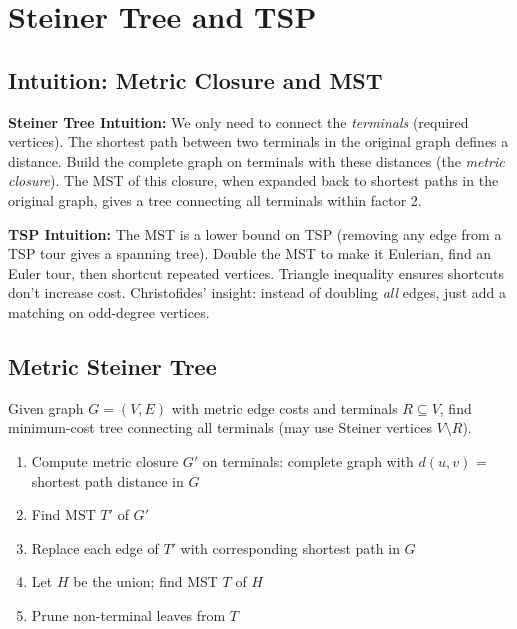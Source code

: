 \setcounter{chapter}{2}
\chapter{Steiner Tree and TSP}
\label{ch:steiner_tsp}

\section{Intuition: Metric Closure and MST}

\begin{intuitionbox}
\textbf{Steiner Tree Intuition:} We only need to connect the \emph{terminals} (required vertices). The shortest path between two terminals in the original graph defines a distance. Build the complete graph on terminals with these distances (the \emph{metric closure}). The MST of this closure, when expanded back to shortest paths in the original graph, gives a tree connecting all terminals within factor 2.

\textbf{TSP Intuition:} The MST is a lower bound on TSP (removing any edge from a TSP tour gives a spanning tree). Double the MST to make it Eulerian, find an Euler tour, then shortcut repeated vertices. Triangle inequality ensures shortcuts don't increase cost. Christofides' insight: instead of doubling \emph{all} edges, just add a matching on odd-degree vertices.
\end{intuitionbox}

\section{Metric Steiner Tree}

\begin{definition}
Given graph $G = (V, E)$ with metric edge costs and terminals $R \subseteq V$, find minimum-cost tree connecting all terminals (may use Steiner vertices $V \setminus R$).
\end{definition}

\begin{algorithmdef}
\begin{enumerate}
    \item Compute metric closure $G'$ on terminals: complete graph with $d(u,v)$ = shortest path distance in $G$
    \item Find MST $T'$ of $G'$
    \item Replace each edge of $T'$ with corresponding shortest path in $G$
    \item Let $H$ be the union; find MST $T$ of $H$
    \item Prune non-terminal leaves from $T$
\end{enumerate}
\end{algorithmdef}

